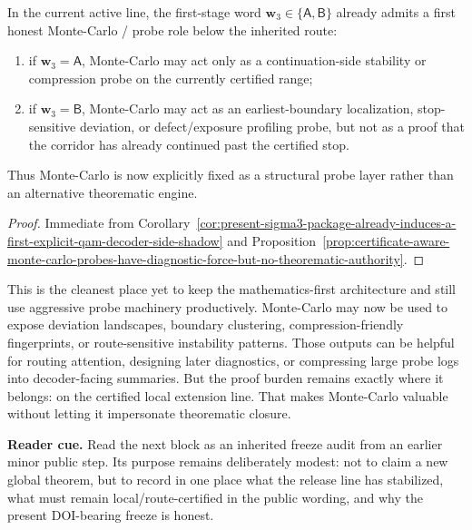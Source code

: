 \begin{corollary}
\label{cor:present-sigma3-package-already-admits-a-first-honest-monte-carlo-role}
In the current active line, the first-stage word \(\mathbf w_3\in\{\mathsf A,\mathsf B\}\) already admits a first honest Monte-Carlo / probe role below the inherited route:
\begin{enumerate}[label=(\roman*)]
 \item if \(\mathbf w_3=\mathsf A\), Monte-Carlo may act only as a continuation-side stability or compression probe on the currently certified range;
 \item if \(\mathbf w_3=\mathsf B\), Monte-Carlo may act as an earliest-boundary localization, stop-sensitive deviation, or defect/exposure profiling probe, but not as a proof that the corridor has already continued past the certified stop.
\end{enumerate}
Thus Monte-Carlo is now explicitly fixed as a structural probe layer rather than an alternative theorematic engine.
\end{corollary}

\begin{proof}
Immediate from Corollary~\ref{cor:present-sigma3-package-already-induces-a-first-explicit-qam-decoder-side-shadow} and Proposition~\ref{prop:certificate-aware-monte-carlo-probes-have-diagnostic-force-but-no-theorematic-authority}.
\end{proof}

\begin{remark}
\label{rem:what-this-monte-carlo-probe-discipline-now-buys}
This is the cleanest place yet to keep the mathematics-first architecture and still use aggressive probe machinery productively. Monte-Carlo may now be used to expose deviation landscapes, boundary clustering, compression-friendly fingerprints, or route-sensitive instability patterns. Those outputs can be helpful for routing attention, designing later diagnostics, or compressing large probe logs into decoder-facing summaries. But the proof burden remains exactly where it belongs: on the certified local extension line. That makes Monte-Carlo valuable without letting it impersonate theorematic closure.
\end{remark}


\noindent\textbf{Reader cue.} Read the next block as an inherited freeze audit from an earlier minor public step. Its purpose remains deliberately modest: not to claim a new global theorem, but to record in one place what the release line has stabilized, what must remain local/route-certified in the public wording, and why the present DOI-bearing freeze is honest.

